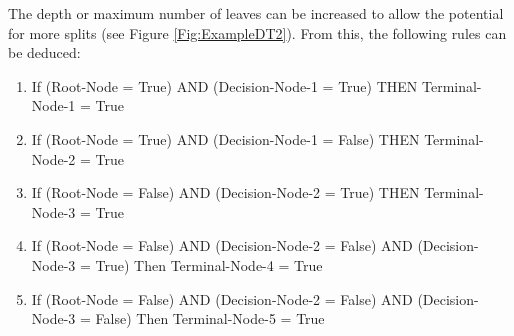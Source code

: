 \documentclass[../thesis.tex]{subfiles}
\begin{document}
The depth or maximum number of leaves can be increased to allow the potential for more splits (see Figure \ref{Fig:ExampleDT2}). From this, the following rules can be deduced:

\begin{enumerate}
    \item If (Root-Node = True) AND (Decision-Node-1 = True) THEN Terminal-Node-1 = True
    \item If (Root-Node = True) AND (Decision-Node-1 = False) THEN Terminal-Node-2 = True
    \item If (Root-Node = False) AND (Decision-Node-2 = True) THEN Terminal-Node-3 = True    
    \item If (Root-Node = False) AND (Decision-Node-2 = False) AND (Decision-Node-3 = True) Then Terminal-Node-4 = True
    \item If (Root-Node = False) AND (Decision-Node-2 = False) AND (Decision-Node-3 = False) Then Terminal-Node-5 = True   
\end{enumerate}
\end{document}
